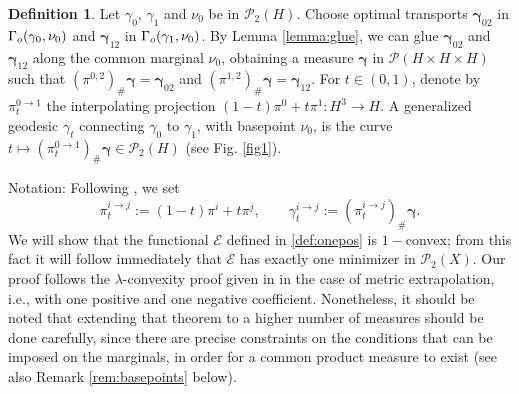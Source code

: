 \documentclass[12pt,a4paper]{article}
\renewcommand{\P}{\mathcal{P}}
\newcommand{\X}{\mathcal{P}_2(H)}
\theoremstyle{plain}
\theoremstyle{definition}
\newtheorem{definition}[theorem]{Definition}
\begin{document}
\begin{definition}
        Let $\gamma_0$, $\gamma_1$ and $\nu_0$ be in $\X$. Choose optimal transports $\boldsymbol{\gamma}_{02}$ in $\Gamma_{\rm o}(\gamma_0,\nu_0)$ and $\boldsymbol{\gamma}_{12}$ in $\Gamma_{\rm o}(\gamma_1,\nu_0)$. By Lemma \ref{lemma:glue}, we can glue $\boldsymbol{\gamma}_{02}$ and $\boldsymbol{\gamma}_{12}$ along the common marginal $\nu_0$, obtaining a measure $\boldsymbol{\gamma}$ in $\P(H \times H \times H)$ such that $(\pi^{0,2})_{\#} \boldsymbol{\gamma} = \boldsymbol{\gamma}_{02}$ and $(\pi^{1,2})_{\#} \boldsymbol{\gamma} = \boldsymbol{\gamma}_{12}$. For $t\in (0,1)$, denote by $\pi^{0\to1}_t$ %
        the interpolating projection $(1-t) \pi^0 + t \pi^1:H^3 \to H$. A generalized geodesic $\gamma_t$ connecting $\gamma_0$ to $\gamma_1$, with basepoint $\nu_0$, is the curve $t \mapsto (\pi^{0\to1}_t)_{\#} \boldsymbol{\gamma} \in \X$ (see Fig. \ref{fig1}).
\end{definition}
\begin{center}
\label{fig1}
\end{center}
Notation: Following \cite{ambrosio-gigli-savare}, we set 
$$
\pi^{i \to j}_t := (1-t) \pi^i + t \pi^j, \qquad \gamma^{i \to j}_t := (\pi^{i \to j}_t)_\# \boldsymbol{\gamma}.
$$
We will show that the functional $\mathscr{E}$ defined in \eqref{def:onepos} is $1-$convex; from this fact it will follow immediately that $\mathscr{E}$ has exactly one minimizer in $\P_2(X)$. Our proof follows the $\lambda$-convexity proof given in \cite[Theorem 3.4]{matthes-plazotta} in the case of metric extrapolation, i.e., with one positive and one negative coefficient. Nonetheless, it should be noted that extending that theorem to a higher number of measures should be done carefully, since there are precise constraints on the conditions that can be imposed on the marginals, in order for a common product measure to exist (see also Remark \ref{rem:basepoints} below).
\end{document}
